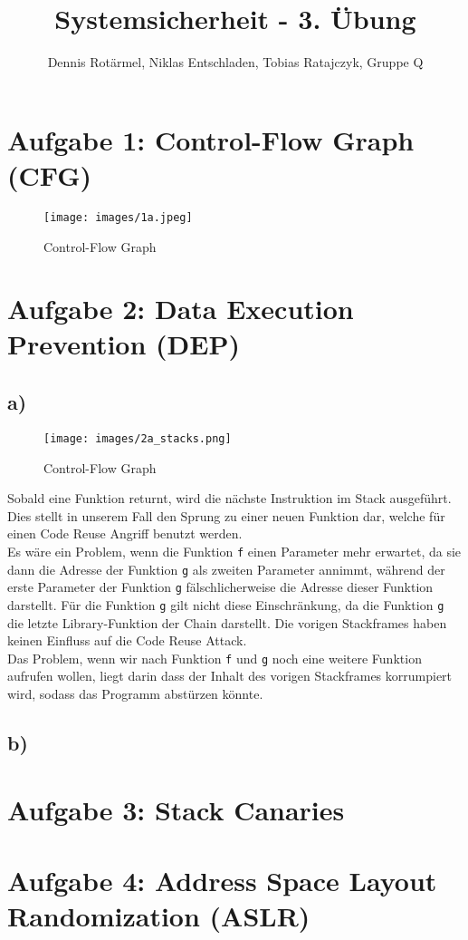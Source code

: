 \documentclass{article}
\title{Systemsicherheit - 3. Übung}
\author{Dennis Rotärmel, Niklas Entschladen, Tobias Ratajczyk, Gruppe Q}
\begin{document}
\maketitle
	
\newpage
\thispagestyle{empty}
\section{Aufgabe 1: Control-Flow Graph (CFG)}
\begin{figure}[h]
	\centering\texttt{[image: images/1a.jpeg]}
	\caption{Control-Flow Graph}
\end{figure}
\pagebreak
\section{Aufgabe 2: Data Execution Prevention (DEP)}
\subsection{a)}
\begin{figure}[h]
\centering\texttt{[image: images/2a\_stacks.png]}
\caption{Control-Flow Graph}
\end{figure}
Sobald eine Funktion returnt, wird die nächste Instruktion im Stack ausgeführt. Dies stellt in unserem Fall den Sprung zu einer neuen Funktion dar, welche für einen Code Reuse Angriff benutzt werden.\\
Es wäre ein Problem, wenn die Funktion \verb|f| einen Parameter mehr erwartet, da sie dann die Adresse der Funktion \verb|g| als zweiten Parameter annimmt, während der erste Parameter der Funktion \verb|g| fälschlicherweise die Adresse dieser Funktion darstellt. Für die Funktion \verb|g| gilt nicht diese Einschränkung, da die Funktion \verb|g| die letzte Library-Funktion der Chain darstellt. Die vorigen Stackframes haben keinen Einfluss auf die Code Reuse Attack.\\
Das Problem, wenn wir nach Funktion \verb|f| und \verb|g| noch eine weitere Funktion aufrufen wollen, liegt darin dass der Inhalt des vorigen Stackframes korrumpiert wird, sodass das Programm abstürzen könnte.
\subsection{b)}

\section{Aufgabe 3: Stack Canaries}
	
\section{Aufgabe 4: Address Space Layout Randomization (ASLR)}
	
\end{document}
